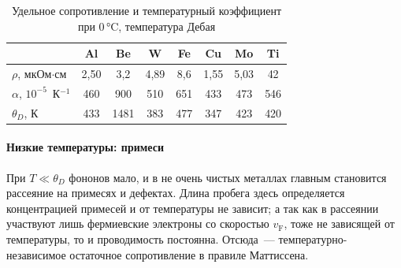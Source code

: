 \begin{table}[ht]
\centering
\caption{Удельное сопротивление и температурный коэффициент при 0\,°C,
температура Дебая}
\label{tab:rho-metals}
\small
\begin{tabular}{@{}lccccccc@{}}
\toprule
 & Al & Be & W & Fe & Cu & Mo & Ti \\
\midrule
$\rho$, мкОм$\cdot$см & 2,50 & 3,2 & 4,89 & 8,6 & 1,55 & 5,03 & 42 \\
$\alpha$, $10^{-5}$~К$^{-1}$ & 460 & 900 & 510 & 651 & 433 & 473 & 546 \\
$\theta_D$, К & 433 & 1481 & 383 & 477 & 347 & 423 & 420 \\
\bottomrule
\end{tabular}
\end{table}

\paragraph{Низкие температуры: примеси}
При $T\ll\theta_D$ фононов мало, и в не очень чистых металлах главным
становится рассеяние на примесях и дефектах. Длина пробега здесь
определяется концентрацией примесей и от температуры не зависит; а так
как в рассеянии участвуют лишь фермиевские электроны со скоростью
$v_\text{F}$, тоже не зависящей от температуры, то и проводимость
постоянна. Отсюда~— температурно-независимое остаточное сопротивление в
правиле Маттиссена.

